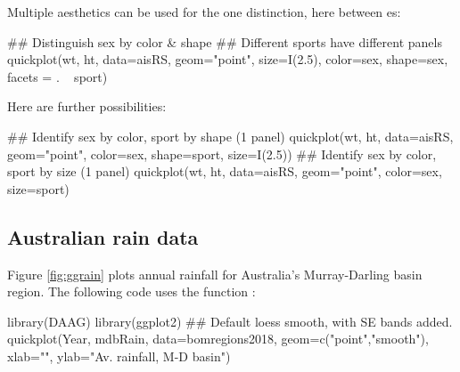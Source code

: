 Multiple aesthetics can be used for the one distinction, here
between es:
\begin{Schunk}
\begin{Sinput}
## Distinguish sex by color & shape
## Different sports have different panels
quickplot(wt, ht, data=aisRS, geom="point",
          size=I(2.5), color=sex, shape=sex,
          facets = . ~ sport)
\end{Sinput}
\end{Schunk}

Here are further possibilities:
\begin{Schunk}
\begin{Sinput}
## Identify sex by color, sport by shape (1 panel)
quickplot(wt, ht, data=aisRS, geom="point",
           color=sex, shape=sport, size=I(2.5))
## Identify sex by color, sport by size (1 panel)
quickplot(wt, ht, data=aisRS, geom="point",
          color=sex, size=sport)
\end{Sinput}
\end{Schunk}

\subsection*{Australian rain data}

 Figure \ref{fig:ggrain} plots annual rainfall for Australia's
 Murray-Darling basin region. The following code uses the
 function :

\begin{Schunk}
\begin{Sinput}
library(DAAG)
library(ggplot2)
## Default loess smooth, with SE bands added.
quickplot(Year, mdbRain, data=bomregions2018,
          geom=c("point","smooth"), xlab="",
          ylab="Av. rainfall, M-D basin")
\end{Sinput}
\end{Schunk}

